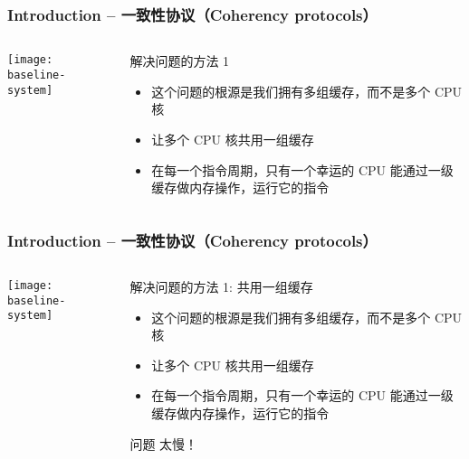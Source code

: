 \begin{frame}[plain]	
	\frametitle{Introduction -- 一致性协议（Coherency protocols） }
	
	
	\begin{columns}
		
		\begin{column}{.4\textwidth}
			\texttt{[image: baseline-system]}
		\end{column}
		\begin{column}{.6\textwidth}
			解决问题的方法 1
			\begin{itemize}
				\item 这个问题的根源是我们拥有多组缓存，而不是多个 CPU 核
				\item 让多个 CPU 核共用一组缓存
				\item 在每一个指令周期，只有一个幸运的 CPU 能通过一级缓存做内存操作，运行它的指令

			\end{itemize}
			
		\end{column}
	\end{columns}
	
\end{frame}


\begin{frame}[plain]	
	\frametitle{Introduction -- 一致性协议（Coherency protocols） }
	
	
	\begin{columns}
		
		\begin{column}{.4\textwidth}
			\texttt{[image: baseline-system]}
		\end{column}
		\begin{column}{.6\textwidth}
			解决问题的方法 1: 共用一组缓存
			\begin{itemize}
				\item 这个问题的根源是我们拥有多组缓存，而不是多个 CPU 核
				\item 让多个 CPU 核共用一组缓存
				\item 在每一个指令周期，只有一个幸运的 CPU 能通过一级缓存做内存操作，运行它的指令
			\end{itemize}
			问题 
			\pause
			太慢！
		\end{column}
	\end{columns}
	
\end{frame}


